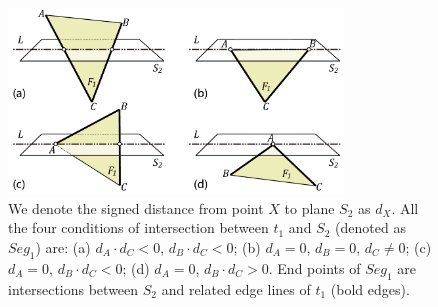 \documentclass[10pt,journal,compsoc]{IEEEtran}
\begin{document}
\begin{figure}[t]
\centering
\includegraphics[width=3.5in]{sign}
\caption{We denote the signed distance from point $X$ to plane $S_2$ as $d_X$. All the four conditions of intersection between $t_1$ and $S_2$ (denoted as $Seg_1$) are:  (a) $d_A\cdot d_C<0$, $d_B\cdot d_C<0$; (b) $d_A=0$, $d_B=0$, $d_C\neq 0$; (c) $d_A=0$, $d_B\cdot d_C<0$; (d) $d_A=0$, $d_B\cdot d_C>0$. End points of $Seg_1$ are intersections between $S_2$ and related edge lines of $t_1$ (bold edges).}
\label{fig:isect}
\end{figure}
\end{document}
